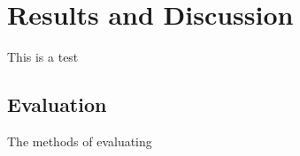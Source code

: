 
\chapter{Results and Discussion}\label{chap:results}

This is a test

\section{Evaluation}

The methods of evaluating
